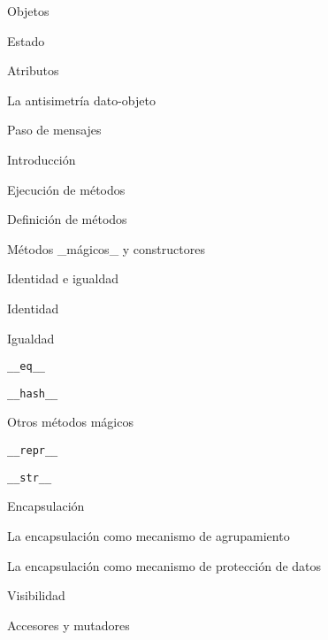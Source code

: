 \begin{longenum}
\begin{longenum}
\begin{longenum}
            \item Objetos
            \item Estado
            \begin{longenum}
                \item Atributos
            \end{longenum}
            \item La antisimetría dato-objeto
        \end{longenum}
        \item Paso de mensajes
        \begin{longenum}
            \item Introducción
            \item Ejecución de métodos
            \item Definición de métodos
            \item Métodos \_mágicos\_ y constructores
        \end{longenum}
        \item Identidad e igualdad
        \begin{longenum}
            \item Identidad
            \item Igualdad
            \begin{longenum}
                \item \texttt{\_\_eq\_\_}
                \item \texttt{\_\_hash\_\_}
            \end{longenum}
            \item Otros métodos mágicos
            \begin{longenum}
                \item \texttt{\_\_repr\_\_}
                \item \texttt{\_\_str\_\_}
            \end{longenum}
        \end{longenum}
        \item Encapsulación
        \begin{longenum}
            \item La encapsulación como mecanismo de agrupamiento
            \item La encapsulación como mecanismo de protección de datos
            \begin{longenum}
                \item Visibilidad
                \item Accesores y mutadores

\end{longenum}
\end{longenum}
\end{longenum}
\end{longenum}
